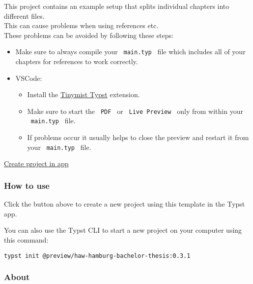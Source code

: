This project contains an example setup that splits individual chapters
into different files.\\
This can cause problems when using references etc.\\
These problems can be avoided by following these steps:

\begin{itemize}
\tightlist
\item
  Make sure to always compile your \texttt{\ main.typ\ } file which
  includes all of your chapters for references to work correctly.
\item
  VSCode:

  \begin{itemize}
  \tightlist
  \item
    Install the
    \href{https://marketplace.visualstudio.com/items?itemName=myriad-dreamin.tinymist}{Tinymist
    Typst} extension.
  \item
    Make sure to start the \texttt{\ PDF\ } or
    \texttt{\ Live\ Preview\ } only from within your
    \texttt{\ main.typ\ } file.
  \item
    If problems occur it usually helps to close the preview and restart
    it from your \texttt{\ main.typ\ } file.
  \end{itemize}
\end{itemize}

\href{/app?template=haw-hamburg-bachelor-thesis&version=0.3.1}{Create
project in app}

\subsubsection{How to use}\label{how-to-use}

Click the button above to create a new project using this template in
the Typst app.

You can also use the Typst CLI to start a new project on your computer
using this command:

\begin{verbatim}
typst init @preview/haw-hamburg-bachelor-thesis:0.3.1
\end{verbatim}



\subsubsection{About}\label{about}

